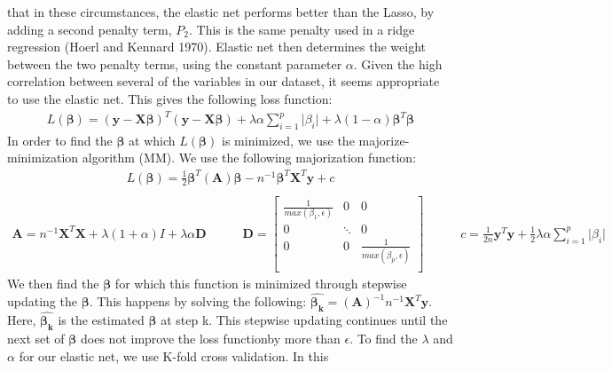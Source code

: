 \documentclass[
]{article}
\begin{document}
that in these circumstances, the elastic net performs better than the
Lasso, by adding a second penalty term, \(P_2\). This is the same
penalty used in a ridge regression (Hoerl and Kennard 1970). Elastic net
then determines the weight between the two penalty terms, using the
constant parameter \(\alpha\). Given the high correlation between
several of the variables in our dataset, it seems appropriate to use the
elastic net. This gives the following loss function: \begin{align*}
    L(\boldsymbol{\beta}) = (\boldsymbol{y} - \mathbf{X}\boldsymbol{\beta})^T(\boldsymbol{y} - \mathbf{X}\boldsymbol{\beta}) + \lambda \alpha \sum_{i=1}^{p} \vert \beta_i \vert + \lambda (1-\alpha) \boldsymbol{\beta}^T\boldsymbol{\beta}
\end{align*} In order to find the \(\boldsymbol{\beta}\) at which
\(L(\boldsymbol{\beta})\) is minimized, we use the majorize-minimization
algorithm (MM). We use the following majorization function:
\begin{align*}
    L(\boldsymbol{\beta})=\frac{1}{2}\boldsymbol{\beta}^T(\mathbf{A})\boldsymbol{\beta} - n^{-1}\boldsymbol{\beta}^T\mathbf{X}^T\boldsymbol{y} + c \\
\end{align*} \begin{align*}
    \mathbf{A} = n^{-1}\mathbf{X}^T\mathbf{X} + \lambda(1+\alpha)I + \lambda \alpha \mathbf{D} \hspace{35pt}
    \mathbf{D} = \begin{bmatrix}
    \frac{1}{max(\beta_1, \epsilon)} &0 &0 \\
    0& \ddots & 0\\
    0& 0& \frac{1}{max(\beta_p, \epsilon)} \\
  \end{bmatrix} \hspace{35pt}
   c = \frac{1}{2n}\boldsymbol{y}^T\boldsymbol{y} + \frac{1}{2}\lambda\alpha  \sum_{i=1}^{p} \vert \beta_i \vert
\end{align*} We then find the \(\boldsymbol{\beta}\) for which this
function is minimized through stepwise updating the
\(\boldsymbol{\beta}\). This happens by solving the following:
\(\hat{\boldsymbol{\beta_k}} = (\mathbf{A})^{-1}n^{-1}\mathbf{X}^T\boldsymbol{y}\).
Here, \(\hat{\boldsymbol{\beta_k}}\) is the estimated
\(\boldsymbol{\beta}\) at step k. This stepwise updating continues until
the next set of \(\boldsymbol{\beta}\) does not improve the loss
functionby more than \(\epsilon\). To find the \(\lambda\) and
\(\alpha\) for our elastic net, we use K-fold cross validation. In this
\end{document}
